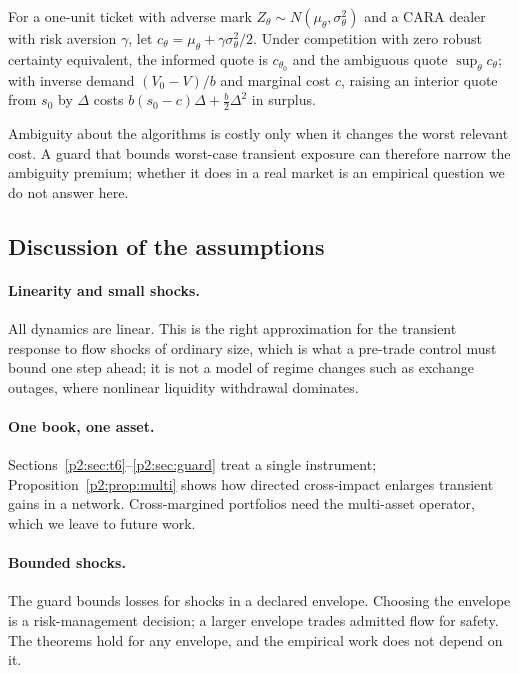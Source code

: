 \begin{proposition}\label{p2:prop:ambig}
For a one-unit ticket with adverse mark $Z_\theta\sim N(\mu_\theta,\sigma_\theta^2)$ and a CARA dealer with risk aversion $\gamma$, let $c_\theta=\mu_\theta+\gamma\sigma_\theta^2/2$. Under competition with zero robust certainty equivalent, the informed quote is $c_{\theta_0}$ and the ambiguous quote $\sup_\theta c_\theta$; with inverse demand $(V_0-V)/b$ and marginal cost $c$, raising an interior quote from $s_0$ by $\Delta$ costs $b(s_0-c)\Delta+\tfrac b2\Delta^2$ in surplus.
\end{proposition}

Ambiguity about the algorithms is costly only when it changes the worst relevant cost. A guard that bounds worst-case transient exposure can therefore narrow the ambiguity premium; whether it does in a real market is an empirical question we do not answer here.

\subsection{Discussion of the assumptions}

\paragraph{Linearity and small shocks.} All dynamics are linear. This is the right approximation for the transient response to flow shocks of ordinary size, which is what a pre-trade control must bound one step ahead; it is not a model of regime changes such as exchange outages, where nonlinear liquidity withdrawal dominates.

\paragraph{One book, one asset.} Sections~\ref{p2:sec:t6}--\ref{p2:sec:guard} treat a single instrument; Proposition~\ref{p2:prop:multi} shows how directed cross-impact enlarges transient gains in a network. Cross-margined portfolios need the multi-asset operator, which we leave to future work.

\paragraph{Bounded shocks.} The guard bounds losses for shocks in a declared envelope. Choosing the envelope is a risk-management decision; a larger envelope trades admitted flow for safety. The theorems hold for any envelope, and the empirical work does not depend on it.

